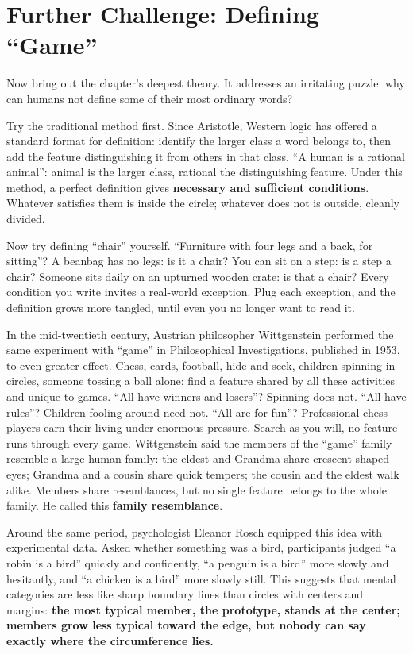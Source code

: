 \section{Further Challenge: Defining ``Game''}
Now bring out the chapter's deepest theory. It addresses an irritating puzzle: why can humans not define some of their most ordinary words?

Try the traditional method first. Since Aristotle, Western logic has offered a standard format for definition: identify the larger class a word belongs to, then add the feature distinguishing it from others in that class. ``A human is a rational animal'': animal is the larger class, rational the distinguishing feature. Under this method, a perfect definition gives \textbf{necessary and sufficient conditions}. Whatever satisfies them is inside the circle; whatever does not is outside, cleanly divided.

Now try defining ``chair'' yourself. ``Furniture with four legs and a back, for sitting''? A beanbag has no legs: is it a chair? You can sit on a step: is a step a chair? Someone sits daily on an upturned wooden crate: is that a chair? Every condition you write invites a real-world exception. Plug each exception, and the definition grows more tangled, until even you no longer want to read it.

In the mid-twentieth century, Austrian philosopher Wittgenstein performed the same experiment with ``game'' in Philosophical Investigations, published in 1953, to even greater effect. Chess, cards, football, hide-and-seek, children spinning in circles, someone tossing a ball alone: find a feature shared by all these activities and unique to games. ``All have winners and losers''? Spinning does not. ``All have rules''? Children fooling around need not. ``All are for fun''? Professional chess players earn their living under enormous pressure. Search as you will, no feature runs through every game. Wittgenstein said the members of the ``game'' family resemble a large human family: the eldest and Grandma share crescent-shaped eyes; Grandma and a cousin share quick tempers; the cousin and the eldest walk alike. Members share resemblances, but no single feature belongs to the whole family. He called this \textbf{family resemblance}.

Around the same period, psychologist Eleanor Rosch equipped this idea with experimental data. Asked whether something was a bird, participants judged ``a robin is a bird'' quickly and confidently, ``a penguin is a bird'' more slowly and hesitantly, and ``a chicken is a bird'' more slowly still. This suggests that mental categories are less like sharp boundary lines than circles with centers and margins: \textbf{the most typical member, the prototype, stands at the center; members grow less typical toward the edge, but nobody can say exactly where the circumference lies.}

